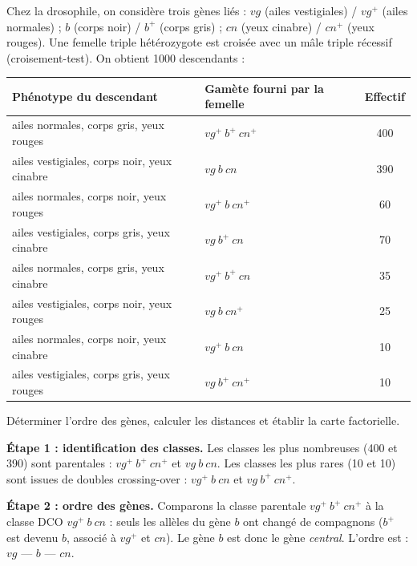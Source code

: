 \documentclass[11pt]{article}
\begin{document}
\begin{exoresolu}
Chez la drosophile, on considère trois gènes liés : $vg$ (ailes vestigiales) / $vg^{+}$ (ailes normales) ; $b$ (corps noir) / $b^{+}$ (corps gris) ; $cn$ (yeux cinabre) / $cn^{+}$ (yeux rouges). Une femelle triple hétérozygote est croisée avec un mâle triple récessif (croisement-test). On obtient 1000 descendants :

\begin{center}
\begin{tabularx}{\linewidth}{|l|X|c|}\hline
\rowcolor{popblueL} Phénotype du descendant & Gamète fourni par la femelle & Effectif \\ \hline
ailes normales, corps gris, yeux rouges & $vg^{+}\ b^{+}\ cn^{+}$ & 400 \\ \hline
ailes vestigiales, corps noir, yeux cinabre & $vg\ b\ cn$ & 390 \\ \hline
ailes normales, corps noir, yeux rouges & $vg^{+}\ b\ cn^{+}$ & 60 \\ \hline
ailes vestigiales, corps gris, yeux cinabre & $vg\ b^{+}\ cn$ & 70 \\ \hline
ailes normales, corps gris, yeux cinabre & $vg^{+}\ b^{+}\ cn$ & 35 \\ \hline
ailes vestigiales, corps noir, yeux rouges & $vg\ b\ cn^{+}$ & 25 \\ \hline
ailes normales, corps noir, yeux cinabre & $vg^{+}\ b\ cn$ & 10 \\ \hline
ailes vestigiales, corps gris, yeux rouges & $vg\ b^{+}\ cn^{+}$ & 10 \\ \hline
\end{tabularx}
\end{center}

Déterminer l'ordre des gènes, calculer les distances et établir la carte factorielle.

\tcblower

\textbf{Étape 1 : identification des classes.} Les classes les plus nombreuses (400 et 390) sont parentales : $vg^{+}\ b^{+}\ cn^{+}$ et $vg\ b\ cn$. Les classes les plus rares (10 et 10) sont issues de doubles crossing-over : $vg^{+}\ b\ cn$ et $vg\ b^{+}\ cn^{+}$.

\textbf{Étape 2 : ordre des gènes.} Comparons la classe parentale $vg^{+}\ b^{+}\ cn^{+}$ à la classe DCO $vg^{+}\ b\ cn$ : seuls les allèles du gène $b$ ont changé de compagnons ($b^{+}$ est devenu $b$, associé à $vg^{+}$ et $cn$). Le gène $b$ est donc le gène \emph{central}. L'ordre est : $vg$ --- $b$ --- $cn$.


\end{exoresolu}
\end{document}
